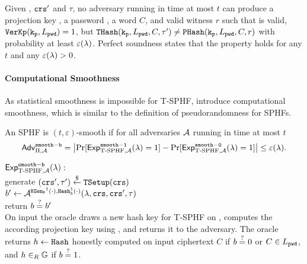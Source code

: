 \begin{definition}
Given \crs, $\mathtt{crs}'$ and $\tau$, no adversary running in time at most $t$ can produce a projection key \hp, a password \pwd, a word $C$, and valid witness $r$ such that \hp is valid, \ie $\mathtt{VerKp}(\mathtt{k_p},L_\mathtt{pwd})=1$, but $\mathtt{THash}(\mathtt{k_p},L_\mathtt{pwd},C,\tau')\not=\mathtt{PHash}(\mathtt{k_p},L_\mathtt{pwd},C,r)$ with probability at least $\varepsilon(\lambda)$.
Perfect soundness states that the property holds for any $t$ and any $\varepsilon(\lambda)>0$.
\eod
\end{definition} 

\paragraph{Computational Smoothness}
As statistical smoothness is impossible for \ac{T-SPHF}, \citet{Benhamouda2013} introduce computational smoothness, which is similar to the definition of pseudorandomness for \acp{SPHF}.

\begin{definition}
An \ac{SPHF} is $(t,\varepsilon)$-smooth if for all adversaries $\mathcal{A}$ running in time at most $t$
\[ \mathsf{Adv}_{\Pi, \mathcal{A}}^{\mathtt{smooth-b}} = \left|\Pr[\mathsf{Exp}^{\mathtt{smooth-1}}_{\text{T-SPHF},\mathcal{A}}(\lambda)=1] - \Pr[\mathsf{Exp}^{\mathtt{smooth-0}}_{\text{T-SPHF},\mathcal{A}}(\lambda)=1]\right| \leq \varepsilon(\lambda).\]

\noindent
$\mathsf{Exp}^{\mathtt{smooth-b}}_{\text{T-SPHF},\mathcal{A}}(\lambda):$ \\
\hspace*{2em} generate $(\mathtt{crs}',\tau')\stackrel{\$}{\gets}\mathtt{TSetup}(\mathtt{crs})$\\
\hspace*{2em} $b'\gets\mathcal{A}^{\mathtt{KGen_P}^1(\cdot), \mathtt{Hash}_b^1(\cdot)}(\lambda, \mathtt{crs}, \mathtt{crs}', \tau)$ \\
\hspace*{2em} return $b\stackrel{?}{=} b'$\\

\noindent
On input \pwd the \PKGen oracle draws a new hash key \hk for \ac{T-SPHF} on \Lpwd, computes the according projection key \hp using \PKGen, and returns it to the adversary.
The \Hash oracle returns $h\gets \mathtt{Hash}$ honestly computed on input ciphertext $C$ if $b\stackrel{?}{=} 0$ or $C\in L_\mathtt{pwd}$, and $h\in_R \mathbb{G}$ if $b\stackrel{?}{=} 1$.
\eod
\end{definition}


